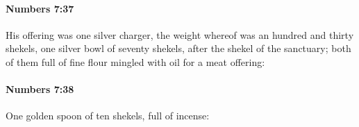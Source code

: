 		\paragraph{Numbers 7:37} %
			\label{NUMBERS-7-37}

			His offering was one silver charger, the weight whereof was an hundred and thirty shekels, one silver bowl of seventy shekels, after the shekel of the sanctuary; both of them full of fine flour mingled with oil for a meat offering:


		\paragraph{Numbers 7:38} %
			\label{NUMBERS-7-38}

			One golden spoon of ten shekels, full of incense:


